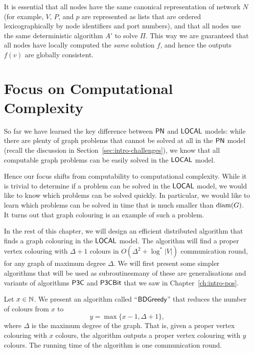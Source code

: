 It is essential that all nodes have the same canonical representation of network $N$ (for example, $V$, $P$, and $p$ are represented as lists that are ordered lexicographically by node identifiers and port numbers), and that all nodes use the same deterministic algorithm $A'$ to solve $\Pi$. This way we are guaranteed that all nodes have locally computed the \emph{same} solution $f$, and hence the outputs $f(v)$ are globally consistent.


\section{Focus on Computational Complexity}

So far we have learned the key difference between $\textsf{PN}$ and $\textsf{LOCAL}$ models: while there are plenty of graph problems that cannot be solved at all in the $\textsf{PN}$ model (recall the discussion in Section~\ref{sec:intro-challenges}), we know that all computable graph problems can be easily solved in the $\textsf{LOCAL}$ model.

Hence our focus shifts from computability to computational complexity. While it is trivial to determine if a problem can be solved in the $\textsf{LOCAL}$ model, we would like to know which problems can be solved quickly. In particular, we would like to learn which problems can be solved in time that is much smaller than $\operatorname{diam}(G)$. It turns out that graph colouring is an example of such a problem.

In the rest of this chapter, we will design an efficient distributed algorithm that finds a graph colouring in the $\textsf{LOCAL}$ model. The algorithm will find a proper vertex colouring with $\Delta+1$ colours in $O(\Delta^2 + \log^* |V|)$ communication round, for any graph of maximum degree $\Delta$. We will first present some simpler algorithms that will be used as subroutines\mydash many of these are generalisations and variants of algorithms $\textsf{P3C}$ and $\textsf{P3CBit}$ that we saw in Chapter~\ref{ch:intro-pos}.


\label{sec:bdgreedy}

Let $x \in \mathbb{N}$. We present an algorithm called ``$\textsf{BDGreedy}$'' that reduces the number of colours from $x$ to
\[
    y = \max \{ x-1, \Delta+1 \},
\]
where $\Delta$ is the maximum degree of the graph. That is, given a proper vertex colouring with $x$ colours, the algorithm outputs a proper vertex colouring with $y$ colours. The running time of the algorithm is one communication round.

